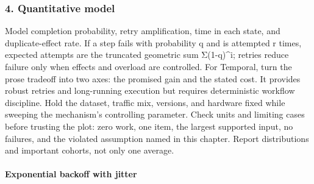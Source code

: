 \subsubsection*{4. Quantitative model}
Model completion probability, retry amplification, time in each state, and duplicate-effect rate. If a step fails with probability q and is attempted r times, expected attempts are the truncated geometric sum Σ(1-q)\textasciicircum{}i; retries reduce failure only when effects and overload are controlled.
For Temporal, turn the prose tradeoff into two axes: the promised gain and the stated cost. It provides robust retries and long-running execution but requires deterministic workflow discipline. Hold the dataset, traffic mix, versions, and hardware fixed while sweeping the mechanism's controlling parameter.
Check units and limiting cases before trusting the plot: zero work, one item, the largest supported input, no failures, and the violated assumption named in this chapter. Report distributions and important cohorts, not only one average.
\paragraph{Exponential backoff with jitter}

